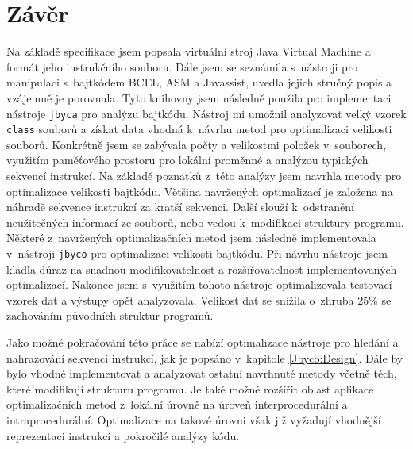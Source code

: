 \chapter{Závěr}\label{Conclusion}


Na základě specifikace \cite{Lindholm:JVM} jsem popsala virtuální stroj Java Virtual Machine a formát jeho instrukčního souboru.  Dále jsem se seznámila s~nástroji pro manipulaci s~bajtkódem BCEL, ASM a Javassist, uvedla jejich stručný popis a vzájemně je porovnala. Tyto knihovny jsem následně použila pro implementaci nástroje \texttt{jbyca} pro analýzu bajtkódu. Nástroj mi umožnil analyzovat velký vzorek \texttt{class} souborů a získat data vhodná k~návrhu metod pro optimalizaci velikosti souborů. Konkrétně jsem se zabývala počty a velikostmi položek v~souborech, využitím paměťového prostoru pro lokální proměnné a analýzou typických sekvencí instrukcí. Na základě poznatků z~této analýzy jsem navrhla metody pro optimalizace velikosti bajtkódu. Většina navržených optimalizací je založena na náhradě sekvence instrukcí za kratší sekvenci. Další slouží k~odstranění neužitečných informací ze souborů, nebo vedou k~modifikaci struktury programu. Některé z~navržených optimalizačních metod jsem následně implementovala v~nástroji \texttt{jbyco} pro optimalizaci velikosti bajtkódu. Při návrhu nástroje jsem kladla důraz na snadnou modifikovatelnost a rozšiřovatelnost implementovaných optimalizací. Nakonec jsem s~využitím tohoto nástroje optimalizovala testovací vzorek dat a výstupy opět analyzovala. Velikost dat se snížila o~zhruba 25\% se zachováním původních struktur programů.

Jako možné pokračování této práce se nabízí optimalizace nástroje pro hledání a nahrazování sekvencí instrukcí, jak je popsáno v~kapitole \ref{Jbyco:Design}.
Dále by bylo vhodné implementovat a analyzovat ostatní navrhnuté metody včetně těch, které modifikují strukturu programu. Je také možné rozšířit oblast aplikace optimalizačních metod z~lokální úrovně na úroveň interprocedurální a intraprocedurální. Optimalizace na takové úrovni však již vyžadují vhodnější reprezentaci instrukcí a pokročilé analýzy kódu.


